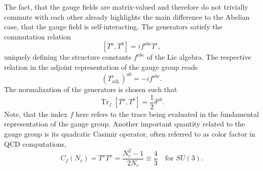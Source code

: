 The fact, that the gauge fields are matrix-valued and therefore do not trivially commute with each other already highlights the main difference to the Abelian case, that the gauge field is self-interacting.
The generators satisfy the commutation relation 
\begin{equation}
\left[T^{a}, T^{b}\right]=i f^{a b c} T^{c},
\end{equation}
uniquely defining the structure constants $f^{abc}$ of the Lie algebra. The respective relation in the adjoint representation of the gauge group reads 
\begin{equation}
	\left(T^c_{\mathrm{adj.}}\right)^{ab} = -if^{abc}.
\end{equation}
The normalization of the generators is chosen such that 
\begin{equation}
\operatorname{Tr}_{f}\left[T^{a}, T^{b}\right]=\frac{1}{2} \delta^{a b}.\label{eqn:normalization}
\end{equation}
Note, that the index $f$ here refers to the trace being evaluated in the fundamental representation of the gauge group. Another important quantity related to the gauge group is its quadratic Casimir operator, often referred to as color factor in QCD computations,
\begin{equation}
	C_f(N_c) = T^{a}T^{a} = \frac{N_c^2-1}{2N_c} \equiv \frac{4}{3} \quad\text{for } SU(3).
\end{equation}


